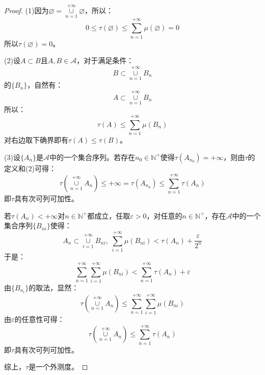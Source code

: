\begin{proof}
	(1)因为$\varnothing=\underset{n=1}{\overset{+\infty}{\cup}}\varnothing$，所以：
	\begin{equation*}
		0\leqslant\tau(\varnothing)\leqslant\sum_{n=1}^{+\infty}\mu(\varnothing)=0
	\end{equation*}
	所以$\tau(\varnothing)=0$。\par
	(2)设$A\subset B$且$A,B\in\mathscr{A}$，对于满足条件：
	\begin{equation*}
		B\subset\underset{n=1}{\overset{+\infty}{\cup}}B_n
	\end{equation*}
	的$\{B_n\}$，自然有：
	\begin{equation*}
		A\subset\underset{n=1}{\overset{+\infty}{\cup}}B_n
	\end{equation*}
	所以：
	\begin{equation*}
		\tau(A)\leqslant\sum_{n=1}^{+\infty}\mu(B_n)
	\end{equation*}
	对右边取下确界即有$\tau(A)\leqslant\tau(B)$。\par
	(3)设$\{A_n\}$是$\mathscr{A}$中的一个集合序列。若存在$n_0\in\mathbb{N}^+$使得$\tau(A_{n_0})=+\infty$，则由$\tau$的定义和(2)可得：
	\begin{equation*}
		\tau\left(\underset{n=1}{\overset{+\infty}{\cup}}A_n\right)\leqslant+\infty=\tau(A_{n_0})\leqslant\sum_{n=1}^{+\infty}\tau(A_n)
	\end{equation*}
	即$\tau$具有次可列可加性。\par
	若$\tau(A_n)<+\infty$对$n\in\mathbb{N}^+$都成立，任取$\varepsilon>0$，对任意的$n\in\mathbb{N}^+$，存在$\mathscr{A}$中的一个集合序列$\{B_{ni}\}$使得：
	\begin{equation*}
		A_n\subset\underset{i=1}{\overset{+\infty}{\cup}}B_{ni},\;
		\sum_{i=1}^{+\infty}\mu(B_{ni})<\tau(A_n)+\frac{\varepsilon}{2^n}
	\end{equation*}
	于是：
	\begin{equation*}
		\sum_{n=1}^{+\infty}\sum_{i=1}^{+\infty}\mu(B_{ni})<\sum_{n=1}^{+\infty}\tau(A_n)+\varepsilon
	\end{equation*}
	由$\{B_{n_i}\}$的取法，显然：
	\begin{equation*}
		\tau\left(\underset{n=1}{\overset{+\infty}{\cup}}A_n\right)\leqslant\sum_{n=1}^{+\infty}\sum_{i=1}^{+\infty}\mu(B_{ni})
	\end{equation*}
	由$\varepsilon$的任意性可得：
	\begin{equation*}
		\tau\left(\underset{n=1}{\overset{+\infty}{\cup}}A_n\right)\leqslant\sum_{n=1}^{+\infty}\tau(A_n)
	\end{equation*}
	即$\tau$具有次可列可加性。\par
	综上，$\tau$是一个外测度。
\end{proof}

